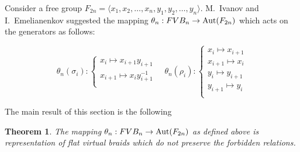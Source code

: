 \documentclass{article}
\newtheorem{theorem}{Theorem}
\begin{document}
Consider a free group $F_{2n}=\langle x_1, x_2,\ldots , x_n, y_1, y_2, \ldots , y_n \rangle$. M.~Ivanov and I.~Emelianenkov suggested the mapping $\theta_n:FVB_n \rightarrow {\rm Aut}(F_{2n})$ which acts on the generators as follows:

$$

\theta_n(\sigma_i):

\begin{cases}

x_i \mapsto x_{i+1}y_{i+1}\\

x_{i+1} \mapsto x_iy_{i+1}^{-1}\\

\end{cases}\quad

\theta_n(\rho_i):

\begin{cases}

x_i \mapsto x_{i+1}\\

x_{i+1} \mapsto x_i\\

y_i \mapsto y_{i+1}\\

y_{i+1} \mapsto y_i\\

\end{cases}

$$



The main result of this section is the following



\begin{theorem}

The mapping $\theta_n:FVB_n \rightarrow {\rm Aut}(F_{2n})$ as defined above is representation of flat virtual braids which do not preserve the forbidden relations.

\end{theorem} 
\end{document}
